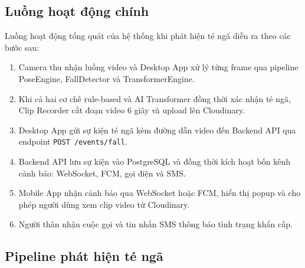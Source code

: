 \subsection{Luồng hoạt động chính}

Luồng hoạt động tổng quát của hệ thống khi phát hiện té ngã diễn
ra theo các bước sau:

\begin{enumerate}[leftmargin=1.5cm]
  \item Camera thu nhận luồng video và Desktop App xử lý từng
        frame qua pipeline PoseEngine, FallDetector và
        TransformerEngine.
  \item Khi cả hai cơ chế rule-based và AI Transformer đồng thời
        xác nhận té ngã, Clip Recorder cắt đoạn video 6 giây và
        upload lên Cloudinary.
  \item Desktop App gửi sự kiện té ngã kèm đường dẫn video đến
        Backend API qua endpoint \texttt{POST /events/fall}.
  \item Backend API lưu sự kiện vào PostgreSQL và đồng thời kích
        hoạt bốn kênh cảnh báo: WebSocket, FCM, gọi điện và SMS.
  \item Mobile App nhận cảnh báo qua WebSocket hoặc FCM, hiển thị
        popup và cho phép người dùng xem clip video từ Cloudinary.
  \item Người thân nhận cuộc gọi và tin nhắn SMS thông báo tình
        trạng khẩn cấp.
\end{enumerate}

\subsection{Pipeline phát hiện té ngã}

